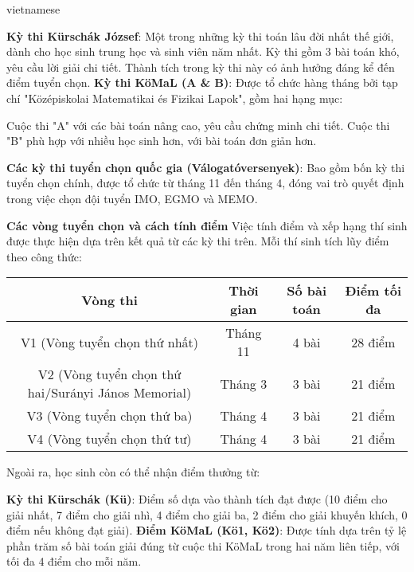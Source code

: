 \documentclass{article}
\begin{document}
\begin{otherlanguage*}{vietnamese}
\begin{itemize}[topsep=0pt, partopsep=0pt, itemsep=0pt]
    \ii \textbf{Kỳ thi Kürschák József}: Một trong những kỳ thi toán lâu đời nhất thế giới, dành cho học sinh trung học và sinh viên năm nhất.
    Kỳ thi gồm 3 bài toán khó, yêu cầu lời giải chi tiết. Thành tích trong kỳ thi này có ảnh hưởng đáng kể đến điểm tuyển chọn.
    \ii \textbf{Kỳ thi KöMaL (A \& B)}: Được tổ chức hàng tháng bởi tạp chí "Középiskolai Matematikai és Fizikai Lapok", gồm hai hạng mục:
    \begin{itemize}
        \ii Cuộc thi "A" với các bài toán nâng cao, yêu cầu chứng minh chi tiết.
        \ii Cuộc thi "B" phù hợp với nhiều học sinh hơn, với bài toán đơn giản hơn.
    \end{itemize}
    \ii \textbf{Các kỳ thi tuyển chọn quốc gia (Válogatóversenyek)}: Bao gồm bốn kỳ thi tuyển chọn chính, được tổ chức từ tháng 11 đến tháng 4,
    đóng vai trò quyết định trong việc chọn đội tuyển IMO, EGMO và MEMO.
\end{itemize}

\textbf{Các vòng tuyển chọn và cách tính điểm}
Việc tính điểm và xếp hạng thí sinh được thực hiện dựa trên kết quả từ các kỳ thi trên. Mỗi thí sinh tích lũy điểm theo công thức:

\begin{center}
    \begin{tabular}{|c|c|c|c|}
        \hline
        \textbf{Vòng thi} & \textbf{Thời gian} & \textbf{Số bài toán} & \textbf{Điểm tối đa} \\
        \hline
        V1 (Vòng tuyển chọn thứ nhất) & Tháng 11 & 4 bài & 28 điểm \\
        \hline
        V2 (Vòng tuyển chọn thứ hai/Surányi János Memorial) & Tháng 3 & 3 bài & 21 điểm \\
        \hline
        V3 (Vòng tuyển chọn thứ ba) & Tháng 4 & 3 bài & 21 điểm \\
        \hline
        V4 (Vòng tuyển chọn thứ tư) & Tháng 4 & 3 bài & 21 điểm \\
        \hline
    \end{tabular}    
\end{center}

Ngoài ra, học sinh còn có thể nhận điểm thưởng từ:
\begin{itemize}[topsep=0pt, partopsep=0pt, itemsep=0pt]
    \ii \textbf{Kỳ thi Kürschák (Kü)}: Điểm số dựa vào thành tích đạt được
    (10 điểm cho giải nhất, 7 điểm cho giải nhì, 4 điểm cho giải ba, 2 điểm cho giải khuyến khích, 0 điểm nếu không đạt giải).
    \ii \textbf{Điểm KöMaL (Kö1, Kö2)}: Được tính dựa trên tỷ lệ phần trăm số bài toán giải đúng từ cuộc thi KöMaL trong hai năm liên tiếp, với tối đa 4 điểm cho mỗi năm.
\end{itemize}


\end{otherlanguage*}
\end{document}
